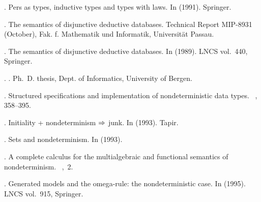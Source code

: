 {\begin{thebibliography}{}
 .
\newblock Pers as types, inductive types and types with laws.
\newblock In  (1991). Springer.

 .
\newblock The semantics of disjunctive deductive databases.
\newblock Technical Report MIP-8931 (October), Fak. f. Mathematik und
  Informatik, Universit\"{a}t Passau.

 .
\newblock The semantics of disjunctive deductive databases.
\newblock In  (1989). LNCS vol.~440, Springer.

 .
\newblock {}.
\newblock Ph.\ D. thesis, Dept. of Informatics, University of Bergen.

 .
\newblock Structured specifications and implementation of nondeterministic data
  types.
\newblock {}~, 358--395.

 .
\newblock Initiality + nondeterminism $\mathrel{\Rightarrow}$ junk.
\newblock In  (1993). Tapir.

 .
\newblock Sets and nondeterminism.
\newblock In 
  (1993).

 .
\newblock A complete calculus for the multialgebraic and functional semantics
  of nondeterminism.
\newblock {}~,~2.

 .
\newblock Generated models and the omega-rule: the nondeterministic case.
\newblock In  (1995). LNCS vol.~915, Springer.


\end{thebibliography}}
